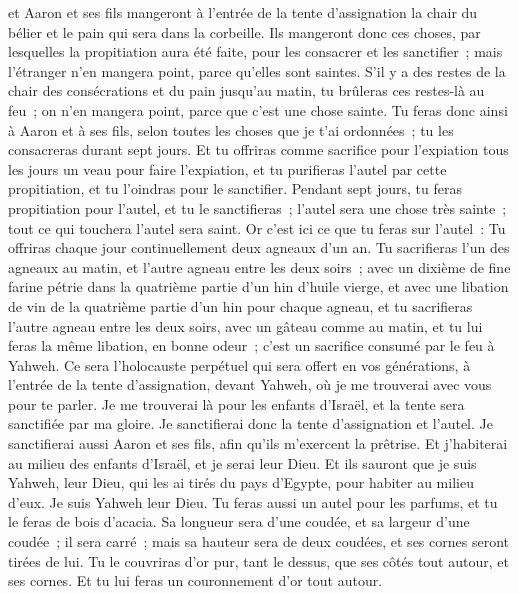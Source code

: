 \begin{multicols}{2}
et Aaron et ses fils mangeront à l'entrée de la tente d'assignation la chair du bélier et le pain qui sera dans la corbeille.
Ils mangeront donc ces choses, par lesquelles la propitiation aura été faite, pour les consacrer et les sanctifier~; mais l'étranger n'en mangera point, parce qu'elles sont saintes.
S'il y a des restes de la chair des consécrations et du pain jusqu'au matin, tu brûleras ces restes-là au feu~; on n'en mangera point, parce que c'est une chose sainte.
Tu feras donc ainsi à Aaron et à ses fils, selon toutes les choses que je t'ai ordonnées~; tu les consacreras durant sept jours.
Et tu offriras comme sacrifice pour l'expiation tous les jours un veau pour faire l'expiation, et tu purifieras l'autel par cette propitiation, et tu l'oindras pour le sanctifier.
Pendant sept jours, tu feras propitiation pour l'autel, et tu le sanctifieras~; l'autel sera une chose très sainte~; tout ce qui touchera l'autel sera saint.
Or c'est ici ce que tu feras sur l'autel~: Tu offriras chaque jour continuellement deux agneaux d'un an.
Tu sacrifieras l'un des agneaux au matin, et l'autre agneau entre les deux soirs~;
avec un dixième de fine farine pétrie dans la quatrième partie d'un hin d'huile vierge, et avec une libation de vin de la quatrième partie d'un hin pour chaque agneau,
et tu sacrifieras l'autre agneau entre les deux soirs, avec un gâteau comme au matin, et tu lui feras la même libation, en bonne odeur~; c'est un sacrifice consumé par le feu à Yahweh.
Ce sera l'holocauste perpétuel qui sera offert en vos générations, à l'entrée de la tente d'assignation, devant Yahweh, où je me trouverai avec vous pour te parler.
Je me trouverai là pour les enfants d'Israël, et la tente sera sanctifiée par ma gloire.
Je sanctifierai donc la tente d'assignation et l'autel. Je sanctifierai aussi Aaron et ses fils, afin qu'ils m'exercent la prêtrise.
 Et j'habiterai au milieu des enfants d'Israël, et je serai leur Dieu.
Et ils sauront que je suis Yahweh, leur Dieu, qui les ai tirés du pays d'Egypte, pour habiter au milieu d'eux. Je suis Yahweh leur Dieu.
\VerseOne{}Tu feras aussi un autel pour les parfums, et tu le feras de bois d'acacia.
Sa longueur sera d'une coudée, et sa largeur d'une coudée~; il sera carré~; mais sa hauteur sera de deux coudées, et ses cornes seront tirées de lui.
Tu le couvriras d'or pur, tant le dessus, que ses côtés tout autour, et ses cornes. Et tu lui feras un couronnement d'or tout autour.

\end{multicols}
